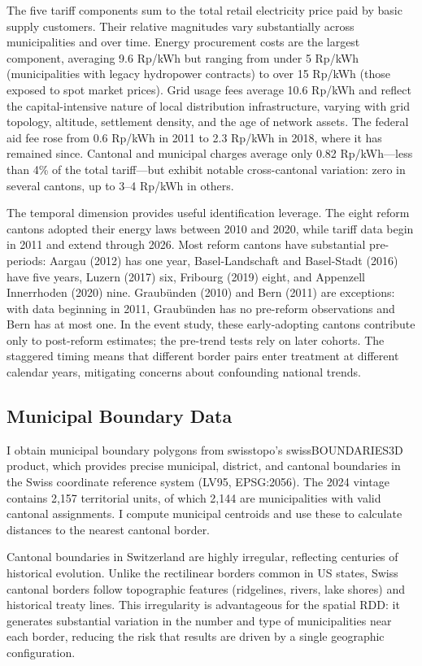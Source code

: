\documentclass[12pt]{article}
\begin{document}
The five tariff components sum to the total retail electricity price paid by basic supply customers. Their relative magnitudes vary substantially across municipalities and over time. Energy procurement costs are the largest component, averaging 9.6 Rp/kWh but ranging from under 5 Rp/kWh (municipalities with legacy hydropower contracts) to over 15 Rp/kWh (those exposed to spot market prices). Grid usage fees average 10.6 Rp/kWh and reflect the capital-intensive nature of local distribution infrastructure, varying with grid topology, altitude, settlement density, and the age of network assets. The federal aid fee rose from 0.6 Rp/kWh in 2011 to 2.3 Rp/kWh in 2018, where it has remained since. Cantonal and municipal charges average only 0.82 Rp/kWh---less than 4\% of the total tariff---but exhibit notable cross-cantonal variation: zero in several cantons, up to 3--4 Rp/kWh in others.

The temporal dimension provides useful identification leverage. The eight reform cantons adopted their energy laws between 2010 and 2020, while tariff data begin in 2011 and extend through 2026. Most reform cantons have substantial pre-periods: Aargau (2012) has one year, Basel-Landschaft and Basel-Stadt (2016) have five years, Luzern (2017) six, Fribourg (2019) eight, and Appenzell Innerrhoden (2020) nine. Graubünden (2010) and Bern (2011) are exceptions: with data beginning in 2011, Graubünden has no pre-reform observations and Bern has at most one. In the event study, these early-adopting cantons contribute only to post-reform estimates; the pre-trend tests rely on later cohorts. The staggered timing means that different border pairs enter treatment at different calendar years, mitigating concerns about confounding national trends.

\subsection{Municipal Boundary Data}

I obtain municipal boundary polygons from swisstopo's swissBOUNDARIES3D product, which provides precise municipal, district, and cantonal boundaries in the Swiss coordinate reference system (LV95, EPSG:2056). The 2024 vintage contains 2,157 territorial units, of which 2,144 are municipalities with valid cantonal assignments. I compute municipal centroids and use these to calculate distances to the nearest cantonal border.

Cantonal boundaries in Switzerland are highly irregular, reflecting centuries of historical evolution. Unlike the rectilinear borders common in US states, Swiss cantonal borders follow topographic features (ridgelines, rivers, lake shores) and historical treaty lines. This irregularity is advantageous for the spatial RDD: it generates substantial variation in the number and type of municipalities near each border, reducing the risk that results are driven by a single geographic configuration.
\end{document}
